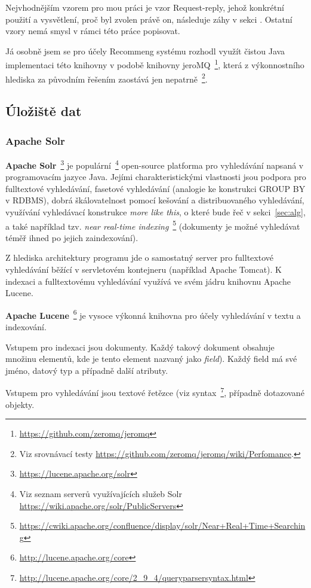 \documentclass[thesis=M,czech]{FITthesis}[2014/05/07]
\begin{document}
Nejvhodnějším vzorem pro mou práci je vzor Request-reply, jehož konkrétní použití a vysvětlení, proč byl zvolen právě on, následuje záhy v sekci . Ostatní vzory nemá smysl v rámci této práce popisovat.

Já osobně jsem se pro účely Recommeng systému rozhodl využít čistou Java implementaci této knihovny v podobě knihovny jeroMQ~\footnote{\url{https://github.com/zeromq/jeromq}}, která z výkonnostního hlediska za původním řešením zaostává jen nepatrně~\footnote{Viz srovnávací testy \url{https://github.com/zeromq/jeromq/wiki/Perfomance}.}.

\subsection{Úložiště dat}

\subsubsection{Apache Solr}
\textbf{Apache Solr}~\footnote{\url{https://lucene.apache.org/solr}} je populární~\footnote{Viz seznam serverů využívajících služeb Solr \url{https://wiki.apache.org/solr/PublicServers}} open-source platforma pro vyhledávání napsaná v programovacím jazyce Java. Jejími charakteristickými vlastnosti jsou podpora pro fulltextové vyhledávání, fasetové vyhledávání (analogie ke konstrukci GROUP BY v RDBMS), dobrá škálovatelnost pomocí kešování a distribuovaného vyhledávání, využívání vyhledávací konstrukce \emph{more like this}, o které bude řeč v sekci~\ref{sec:alg}, a také například tzv. \emph{near real-time indexing}~\footnote{\url{https://cwiki.apache.org/confluence/display/solr/Near+Real+Time+Searching}} (dokumenty je možné vyhledávat téměř ihned po jejich zaindexování).

Z hlediska architektury programu jde o samostatný server pro fulltextové vyhledávání běžící v servletovém kontejneru (například Apache Tomcat). K indexaci a fulltextovému vyhledávání využívá ve svém jádru knihovnu Apache Lucene. 

\textbf{Apache Lucene}~\footnote{\url{http://lucene.apache.org/core}} je vysoce výkonná knihovna pro účely vyhledávání v textu a indexování.

Vstupem pro indexaci jsou dokumenty. Každý takový dokument obsahuje množinu elementů, kde je tento element nazvaný jako \emph{field}). Každý field má své jméno, datový typ a případně další atributy.

Vstupem pro vyhledávání jsou textové řetězce (viz syntax~\footnote{\url{http://lucene.apache.org/core/2_9_4/queryparsersyntax.html}}, případně dotazované objekty.
\end{document}
